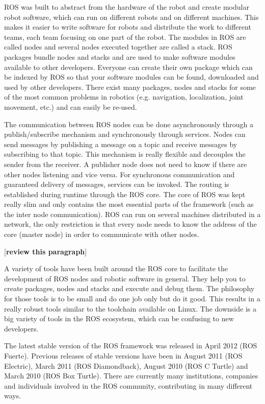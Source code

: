 ROS was built to abstract from the hardware of the robot and create modular robot software, which can run on different robots and on different machines. This makes it easier to write software for robots and distribute the work to different teams, each team focusing on one part of the robot. The modules in ROS are called nodes and several nodes executed together are called a stack. ROS packages bundle nodes and stacks and are used to make software modules available to other developers. Everyone can create their own package which can be indexed by ROS so that your software modules can be found, downloaded and used by other developers. There exist many packages, nodes and stacks for some of the most common problems in robotics (e.g. navigation, localization, joint movement, etc.) and can easily be re-used.

The communication between ROS nodes can be done asynchronously through a publish/subscribe mechanism and synchronously through services. Nodes can send messages by publishing a message on a topic and receive messages by subscribing to that topic. This mechanism is really flexible and decouples the sender from the receiver. A publisher node does not need to know if there are other nodes listening and vice versa. For synchronous communication and guaranteed delivery of messages, services can be invoked. The routing is established during runtime through the ROS core. The core of ROS was kept really slim and only contains the most essential parts of the framework (such as the inter node communication). ROS can run on several machines distributed in a network, the only restriction is that every node needs to know the address of the core (master node) in order to communicate with other nodes.

[\textbf{review this paragraph}]

A variety of tools have been built around the ROS core to facilitate the development of ROS nodes and robotic software in general. They help you to create packages, nodes and stacks and execute and debug them. The philosophy for those tools is to be small and do one job only but do it good. This results in a really robust tools similar to the toolchain available on Linux. The downside is a big variety of tools in the ROS ecosystem, which can be confusing to new developers.

The latest stable version of the ROS framework was released in April 2012 (ROS Fuerte). Previous releases of stable versions have been in August 2011 (ROS Electric), March 2011 (ROS Diamondback), August 2010 (ROS C Turtle) and March 2010 (ROS Box Turtle). There are currently many institutions, companies and individuals involved in the ROS community, contributing in many different ways.

